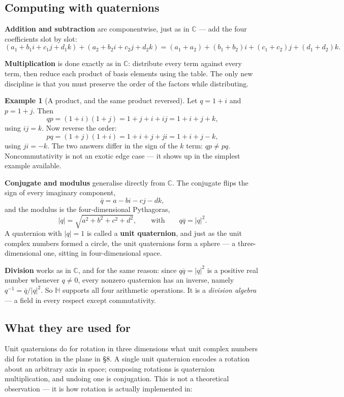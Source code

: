 \documentclass[11pt]{article}
\theoremstyle{definition}
\newtheorem{ex}{Example}
\theoremstyle{remark}
\newcommand{\C}{\mathbb{C}}
\newcommand{\Hq}{\mathbb{H}}
\newcommand{\conj}[1]{\overline{#1}}
\begin{document}
\subsection{Computing with quaternions}
\textbf{Addition and subtraction} are componentwise, just as in $\C$ --- add the
four coefficients slot by slot:
\[
  (a_1+b_1i+c_1j+d_1k)+(a_2+b_2i+c_2j+d_2k)
  = (a_1{+}a_2)+(b_1{+}b_2)i+(c_1{+}c_2)j+(d_1{+}d_2)k .
\]

\noindent\textbf{Multiplication} is done exactly as in $\C$: distribute every
term against every term, then reduce each product of basis elements using the
table. The only new discipline is that you must preserve the order of the
factors while distributing.

\begin{ex}[A product, and the same product reversed]
Let $q=1+i$ and $p=1+j$. Then
\[
  qp = (1+i)(1+j) = 1 + j + i + ij = 1 + i + j + k ,
\]
using $ij=k$. Now reverse the order:
\[
  pq = (1+j)(1+i) = 1 + i + j + ji = 1 + i + j - k ,
\]
using $ji=-k$. The two answers differ in the sign of the $k$ term:
$qp\neq pq$. Noncommutativity is not an exotic edge case --- it shows up in the
simplest example available.
\end{ex}

\noindent\textbf{Conjugate and modulus} generalise directly from $\C$. The
conjugate flips the sign of every imaginary component,
\[
  \conj{q} = a - bi - cj - dk ,
\]
and the modulus is the four-dimensional Pythagoras,
\[
  \lvert q\rvert = \sqrt{a^{2}+b^{2}+c^{2}+d^{2}} ,
  \qquad\text{with}\qquad
  q\conj{q} = \lvert q\rvert^{2} .
\]
A quaternion with $\lvert q\rvert=1$ is called a \textbf{unit quaternion}, and
just as the unit complex numbers formed a circle, the unit quaternions form a
sphere --- a three-dimensional one, sitting in four-dimensional space.

\noindent\textbf{Division} works as in $\C$, and for the same reason: since
$q\conj{q}=\lvert q\rvert^{2}$ is a positive real number whenever $q\neq0$, every
nonzero quaternion has an inverse, namely
$q^{-1}=\conj{q}/\lvert q\rvert^{2}$. So $\Hq$ supports all four arithmetic
operations. It is a \emph{division algebra} --- a field in every respect except
commutativity.

\subsection{What they are used for}
Unit quaternions do for rotation in three dimensions what unit complex numbers
did for rotation in the plane in \S8. A single unit quaternion encodes a
rotation about an arbitrary axis in space; composing rotations is quaternion
multiplication, and undoing one is conjugation. This is not a theoretical
observation --- it is how rotation is actually implemented in:
\end{document}

